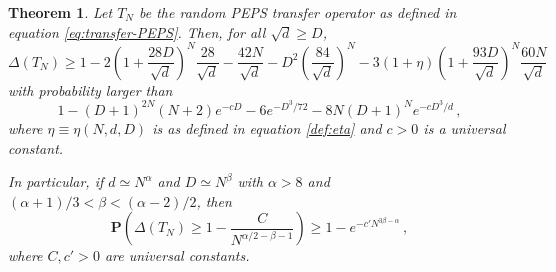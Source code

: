 \documentclass{amsart}
\newtheorem{theorem}{Theorem}[section]
\renewcommand{\P}{\mathbf{P}}
\renewcommand{\geq}{\geqslant}
\begin{document}
\begin{theorem} \label{th:gap-PEPS}
    Let $T_N$ be the random PEPS transfer operator as defined in equation \eqref{eq:transfer-PEPS}. Then, for all $\sqrt{d}\geq D$,
    \begin{equation} \label{eq:gap-PEPS}
        \Delta(T_N) \geq 1 - 2\left(1+\frac{28D}{\sqrt{d}}\right)^N\frac{28}{\sqrt{d}} - \frac{42N}{\sqrt{d}}-D^2\left(\frac{84}{\sqrt{d}}\right)^N - 3(1+\eta)\left(1+\frac{93D}{\sqrt{d}}\right)^N\frac{60N}{\sqrt{d}}
    \end{equation}
    with probability larger than
    \[ 1-(D+1)^{2N} (N+2)e^{-cD}-6e^{-D^3/72}-8N(D+1)^{N}e^{-cD^3/d} \, , \]
    where $\eta\equiv\eta(N,d,D)$ is as defined in equation \eqref{def:eta} and $c>0$ is a universal constant.

    In particular, if $d\simeq N^{\alpha}$ and $D\simeq N^{\beta}$ with $\alpha>8$ and $(\alpha+1)/3<\beta<(\alpha-2)/2$, then
    \begin{equation} \label{eq:gap-PEPS-specific}
        \P\left( \Delta(T_N) \geq 1-\frac{C}{N^{\alpha/2-\beta-1}} \right) \geq 1-e^{-c'N^{3\beta-\alpha}} \, ,
    \end{equation}
    where $C,c'>0$ are universal constants.
\end{theorem}
\end{document}
